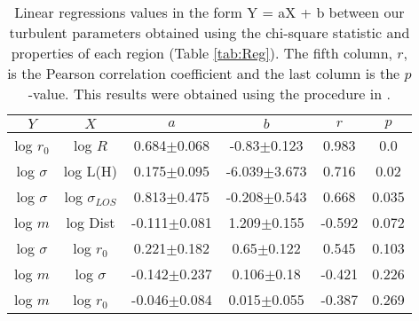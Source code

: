 \begin{table*}
\begin{center}
\caption{Linear regressions values in the form Y = aX + b between our turbulent parameters obtained using the chi-square statistic and properties of each region (Table \ref{tab:Reg}). The fifth column, $r$, is the Pearson correlation coefficient and the last column is the $p$-value. This results were obtained using the procedure in \citet{2007ApJ...665.1489K}.}
\begin{tabular}{cccccc}
\hline
            $Y$ &                   $X$ &                 $a$ &                 $b$ &       $r$ &      $p$ \\
\hline
    log $r_0$ &             log $R$ &   0.684$\pm$0.068 &   -0.83$\pm$0.123 &   0.983 &    0.0 \\
 log $\sigma$ &            log L(H) &   0.175$\pm$0.095 &  -6.039$\pm$3.673 &   0.716 &   0.02 \\
 log $\sigma$ &  log $\sigma_{LOS}$ &   0.813$\pm$0.475 &  -0.208$\pm$0.543 &   0.668 &  0.035 \\
      log $m$ &            log Dist &  -0.111$\pm$0.081 &   1.209$\pm$0.155 &  -0.592 &  0.072 \\
 log $\sigma$ &         log $r_{0}$ &   0.221$\pm$0.182 &    0.65$\pm$0.122 &   0.545 &  0.103 \\
      log $m$ &        log $\sigma$ &  -0.142$\pm$0.237 &    0.106$\pm$0.18 &  -0.421 &  0.226 \\
      log $m$ &         log $r_{0}$ &  -0.046$\pm$0.084 &   0.015$\pm$0.055 &  -0.387 &  0.269 \\
\hline
\end{tabular}\label{tab:RestStats}
\end{center}
\end{table*}


